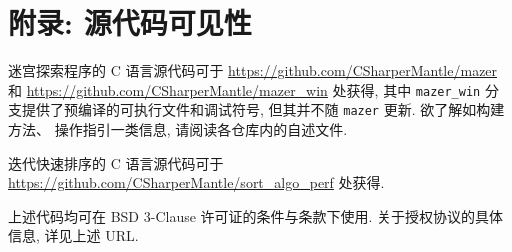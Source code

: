 \documentclass[a4paper]{article}
\begin{document}


\section{附录: 源代码可见性}
\label{appendix_source_code}

迷宫探索程序的 C 语言源代码可于 \url{https://github.com/CSharperMantle/mazer} 和 \url{https://github.com/CSharperMantle/mazer_win} 处获得, 其中 \texttt{mazer\_win} 分支提供了预编译的可执行文件和调试符号, 但其并不随 \texttt{mazer} 更新. 欲了解如构建方法、 操作指引一类信息, 请阅读各仓库内的自述文件.

迭代快速排序的 C 语言源代码可于 \url{https://github.com/CSharperMantle/sort_algo_perf} 处获得.

上述代码均可在 BSD 3-Clause 许可证的条件与条款下使用. 关于授权协议的具体信息, 详见上述 URL.
\end{document}

